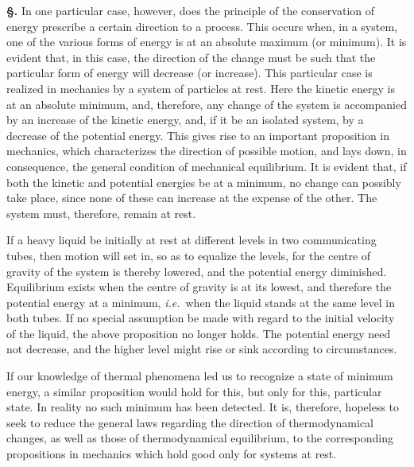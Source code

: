 \documentclass[12pt]{book}[2005/09/16]
\newcommand{\Section}[1]{
  \medskip\par\textbf{§\;#1}
  \label{section:#1}
}
\newcommand{\PageSep}[1]{\ignorespaces}
\newcommand{\ie}{\emph{i.e.}}
\begin{document}
\Section{107.} In one particular case, however, does the principle
of the conservation of energy prescribe a certain direction
to a process. This occurs when, in a system, one of the
various forms of energy is at an absolute maximum (or
minimum). It is evident that, in this case, the direction of
the change must be such that the particular form of energy
will decrease (or increase). This particular case is realized
in mechanics by a system of particles at rest. Here the
kinetic energy is at an absolute minimum, and, therefore,
any change of the system is accompanied by an increase of
the kinetic energy, and, if it be an isolated system, by a
decrease of the potential energy. This gives rise to an
important proposition in mechanics, which characterizes the
direction of possible motion, and lays down, in consequence,
the general condition of mechanical equilibrium. It is
evident that, if both the kinetic and potential energies be
at a minimum, no change can possibly take place, since
none of these can increase at the expense of the other.
The system must, therefore, remain at rest.

If a heavy liquid be initially at rest at different levels in
two communicating tubes, then motion will set in, so as to
\PageSep{79}
equalize the levels, for the centre of gravity of the system
is thereby lowered, and the potential energy diminished.
Equilibrium exists when the centre of gravity is at its
lowest, and therefore the potential energy at a minimum,
\ie\ when the liquid stands at the same level in both tubes.
If no special assumption be made with regard to the initial
velocity of the liquid, the above proposition no longer holds.
The potential energy need not decrease, and the higher level
might rise or sink according to circumstances.

If our knowledge of thermal phenomena led us to
recognize a state of minimum energy, a similar proposition
would hold for this, but only for this, particular state. In
reality no such minimum has been detected. It is, therefore,
hopeless to seek to reduce the general laws regarding
the direction of thermodynamical changes, as well as those
of thermodynamical equilibrium, to the corresponding propositions
in mechanics which hold good only for systems at
rest.
\end{document}
